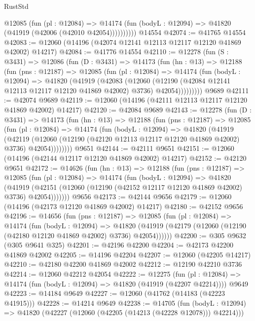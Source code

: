 \begin{lexlean}{RustStd}
\begin{coremodule}
            @12085
              (fun (pl : @12084) =>
              @14174 (fun (bodyL : @12094) => @41820 (@41919 (@42006 (@42010 @42054))))))))))
    @14554
@42074 := @41765 @14554
@42083 := @12060 (@14196 (@42074 @12141 @12113 @12117 @12120 @41869 @42002) @14217)
@42084 := @41776 @14554
@42110 := @12278
    (fun (S : @3431) =>
    @12086
      (fun (D : @3431) =>
      @14173
        (fun (hn : @13) =>
        @12188
          (fun (pns : @12187) =>
          @12085
            (fun (pl : @12084) =>
            @14174
              (fun (bodyL : @12094) =>
              @41820
                (@41919
                  (@42083
                    (@12060
                      (@12190 (@42084 @12141 @12113 @12117 @12120 @41869 @42002) @3736)
                      @42054)))))))))
    @9689
@42111 := @42074 @9689
@42119 := @12060 (@14196 (@42111 @12113 @12117 @12120 @41869 @42002) @14217)
@42120 := @42084 @9689
@42143 := @12278
    (fun (D : @3431) =>
    @14173
      (fun (hn : @13) =>
      @12188
        (fun (pns : @12187) =>
        @12085
          (fun (pl : @12084) =>
          @14174
            (fun (bodyL : @12094) =>
            @41820
              (@41919
                (@42119
                  (@12060 (@12190 (@42120 @12113 @12117 @12120 @41869 @42002) @3736) @42054))))))))
    @9651
@42144 := @42111 @9651
@42151 := @12060 (@14196 (@42144 @12117 @12120 @41869 @42002) @14217)
@42152 := @42120 @9651
@42172 := @14626
    (fun (hn : @13) =>
    @12188
      (fun (pns : @12187) =>
      @12085
        (fun (pl : @12084) =>
        @14174
          (fun (bodyL : @12094) =>
          @41820
            (@41919
              (@42151 (@12060 (@12190 (@42152 @12117 @12120 @41869 @42002) @3736) @42054)))))))
    @9656
@42173 := @42144 @9656
@42179 := @12060 (@14196 (@42173 @12120 @41869 @42002) @14217)
@42180 := @42152 @9656
@42196 := @14656
    (fun (pns : @12187) =>
    @12085
      (fun (pl : @12084) =>
      @14174
        (fun (bodyL : @12094) =>
        @41820 (@41919 (@42179 (@12060 (@12190 (@42180 @12120 @41869 @42002) @3736) @42054))))))
@42200 := @305 @9632 (@305 @9641 @325)
@42201 := @42196 @42200
@42204 := @42173 @42200 @41869 @42002
@42205 := @14196 @42204
@42207 := @12060 (@42205 @14217)
@42210 := @42180 @42200 @41869 @42002
@42212 := @12190 @42210 @3736
@42214 := @12060 @42212 @42054
@42222 := @12275
    (fun (pl : @12084) => @14174 (fun (bodyL : @12094) => @41820 (@41919 (@42207 @42214))))
    @9649
@42223 := @14184 @9649
@42227 := @12060 (@41762 (@14183 (@42223 @41915)))
@42228 := @14214 @9649
@42238 := @14705
    (fun (bodyL : @12094) => @41820 (@42227 (@12060 (@42205 (@14213 (@42228 @12078))) @42214)))

\end{coremodule}
\end{lexlean}
